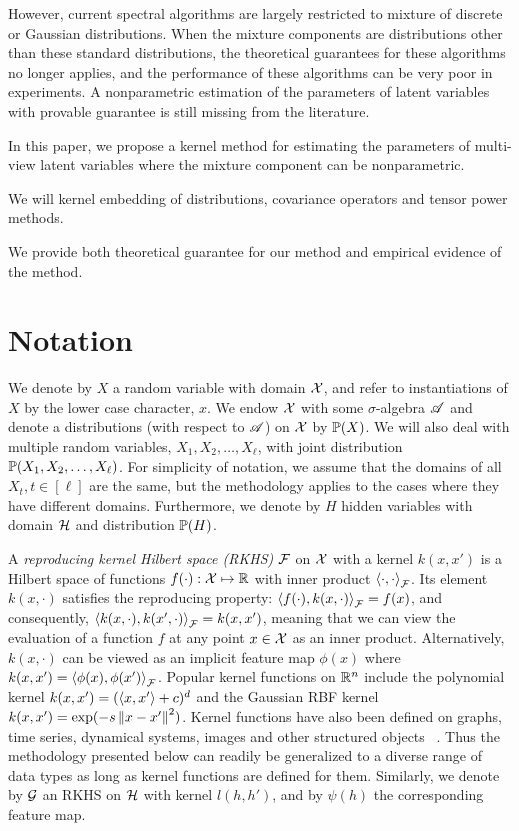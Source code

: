 \documentclass{article}
\begin{document}
However, current spectral algorithms are largely restricted to mixture
of discrete or Gaussian distributions. When the mixture components are distributions other than these standard distributions, the theoretical guarantees for these algorithms no longer applies, and the performance of these algorithms can be very poor in experiments. A nonparametric estimation of the parameters of latent variables with provable guarantee is still missing from the literature.

In this paper, we propose a kernel method for estimating the parameters of multi-view latent variables where the mixture component can be nonparametric.

We will kernel embedding of distributions, covariance operators and tensor power methods.

We provide both theoretical guarantee for our method and empirical evidence of the method.

\section{Notation}

We denote by $X$ a random variable with domain $\mathcal{X}$,
and refer to instantiations of $X$ by the lower case character, $x$.
We endow $\mathcal{X}$ with some $\sigma$-algebra $\mathscr{A}$ and denote a distributions (with respect to $\mathscr{A}$) on $\mathcal{X}$ by $\mathbb{P}(X)$. We will also deal with multiple random variables, $X_1, X_2, \ldots, X_{\ell}$, with joint distribution $\mathbb{P}(X_1,X_2,\ldots,X_{\ell})$. For simplicity of notation, we assume that the domains of all $X_t, t \in [\ell]$ are the same, but the methodology applies to the cases where they have different domains. Furthermore, we denote by $H$ hidden variables with domain $\mathcal{H}$ and distribution $\mathbb{P}(H)$.

A \emph{reproducing kernel Hilbert space (RKHS)} $\mathcal{F}$ on $\mathcal{X}$ with a kernel $k(x,x')$ is a Hilbert space of
functions $f(\cdot):\mathcal{X} \mapsto \mathbb{R}$ with inner product $\left\langle \cdot,\cdot \right\rangle_{\mathcal{F}}$. Its element $k(x,\cdot)$ satisfies the reproducing property:
$\left\langle f(\cdot),k(x, \cdot) \right\rangle_{\mathcal{F}} = f(x)$, and consequently, $\left\langle k(x,\cdot),k(x', \cdot) \right\rangle_{\mathcal{F}} = k(x,x')$,
meaning that we can view the evaluation of a function $f$ at any point $x\in\mathcal{X}$ as an inner product. Alternatively, $k(x,\cdot)$ can  be viewed as an implicit feature map $\phi(x)$ where $k(x,x')=\left\langle \phi(x),\phi(x') \right\rangle_{\mathcal{F}}$.
Popular kernel functions on $\mathbb{R}^n$ include the polynomial kernel $k(x,x') =
(\left\langle x,x' \right\rangle+c)^d$ and the Gaussian RBF kernel $k(x,x') = \exp(-s
  \left\|x-x'\right\|^2)$. Kernel functions have also been defined on
graphs, time series, dynamical systems, images and other structured
objects \, \cite{SchTsuVer04}. Thus the methodology presented below can  readily be generalized to a diverse range of data types as long as kernel functions are defined for them. Similarly, we denote by $\mathcal{G}$ an RKHS on $\mathcal{H}$ with kernel $l(h,h')$, and by $\psi(h)$ the corresponding feature map.
\end{document}
